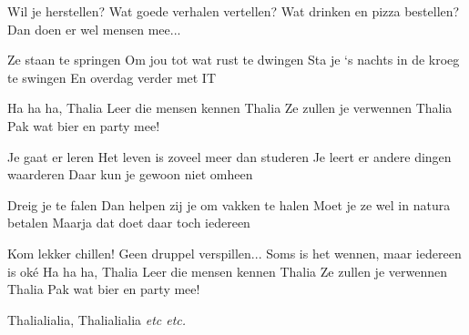 \begin{verse*}
Wil je herstellen?
Wat goede verhalen vertellen?
Wat drinken en pizza bestellen?
Dan doen er wel mensen mee...
\end{verse*}

\begin{verse*}
Ze staan te springen
Om jou tot wat rust te dwingen
Sta je ‘s nachts in de kroeg te swingen
En overdag verder met IT
\end{verse*}

\begin{chorus}
Ha ha ha, Thalia
Leer die mensen kennen
Thalia
Ze zullen je verwennen
Thalia
Pak wat bier en party mee!
\end{chorus}

\begin{verse*}
Je gaat er leren
Het leven is zoveel meer dan studeren
Je leert er andere dingen waarderen
Daar kun je gewoon niet omheen
\end{verse*}

\begin{verse*}
Dreig je te falen
Dan helpen zij je om vakken te halen
Moet je ze wel in natura betalen
Maarja dat doet daar toch iedereen
\end{verse*}

\thechorus[2]

\begin{bridge}
Kom lekker chillen! Geen druppel verspillen...
Soms is het wennen, maar iedereen is oké
Ha ha ha, Thalia
Leer die mensen kennen
Thalia
Ze zullen je verwennen
Thalia
Pak wat bier en party mee!
\end{bridge}

\thechorus

Thalialialia, Thalialialia \textit{etc etc.}
